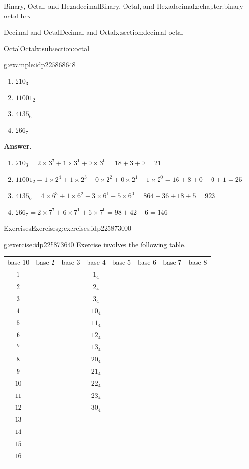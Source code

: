 \documentclass[twoside,10pt,]{book}
\newcommand{\blocktitlefont}{\relax}
\newcommand{\tabularfont}{\relax}
\numberwithin{equation}{section}
\newcommand{\hrulethin}  {\noalign{\hrule height 0.04em}}
\newcommand{\hrulemedium}{\noalign{\hrule height 0.07em}}
\newcommand{\hrulethick} {\noalign{\hrule height 0.11em}}
\begin{document}
\begin{chapterptx}{Binary, Octal, and Hexadecimal}{}{Binary, Octal, and Hexadecimal}{}{}{x:chapter:binary-octal-hex}
\begin{sectionptx}{Decimal and Octal}{}{Decimal and Octal}{}{}{x:section:decimal-octal}
\begin{subsectionptx}{Octal}{}{Octal}{}{}{x:subsection:octal}
\begin{example}{}{g:example:idp225868648}
\begin{enumerate}
\item{}\(\displaystyle 210_3\)%
\item{}\(\displaystyle 11001_2\)%
\item{}\(\displaystyle 4135_6\)%
\item{}\(\displaystyle 266_7\)%
\end{enumerate}
%
\par\smallskip%
\noindent\textbf{\blocktitlefont Answer}.\label{g:answer:idp225875176}{}\hypertarget{g:answer:idp225875176}{}\quad{}%
\begin{enumerate}
\item{}\(\displaystyle 210_3=2\times 3^2+1\times 3^1+0\times 3^0=18+3+0=21\)%
\item{}\(\displaystyle 11001_2=1\times 2^4+1\times 2^3+0\times 2^2+0\times 2^1+1\times 2^0=16+8+0+0+1=25\)%
\item{}\(\displaystyle 4135_6=4\times 6^3+1\times 6^2+3\times 6^1+5\times 6^0=864+36+18+5=923\)%
\item{}\(\displaystyle 266_7=2\times 7^2+6\times 7^1+6\times 7^0=98+42+6=146\)%
\end{enumerate}
%
\end{example}
\end{subsectionptx}
%
%
\typeout{************************************************}
\typeout{************************************************}
%
\begin{exercises-subsection}{Exercises}{}{Exercises}{}{}{g:exercises:idp225873000}
\begin{divisionexercise}{1}{}{}{g:exercise:idp225873640}%
Exercise involves the following table. \begin{center}%
{\tabularfont%
\begin{tabular}{cccccccc}\hrulethick
base 10&base 2&base 3&base 4&base 5&base 6&base 7&base 8\tabularnewline\hrulemedium
\(1\)&&&\(1_4\)&&&&\tabularnewline\hrulethin
\(2\)&&&\(2_4\)&&&&\tabularnewline\hrulethin
\(3\)&&&\(3_4\)&&&&\tabularnewline\hrulethin
\(4\)&&&\(10_4\)&&&&\tabularnewline\hrulethin
\(5\)&&&\(11_4\)&&&&\tabularnewline\hrulethin
\(6\)&&&\(12_4\)&&&&\tabularnewline\hrulethin
\(7\)&&&\(13_4\)&&&&\tabularnewline\hrulethin
\(8\)&&&\(20_4\)&&&&\tabularnewline\hrulethin
\(9\)&&&\(21_4\)&&&&\tabularnewline\hrulethin
\(10\)&&&\(22_4\)&&&&\tabularnewline\hrulethin
\(11\)&&&\(23_4\)&&&&\tabularnewline\hrulethin
\(12\)&&&\(30_4\)&&&&\tabularnewline\hrulethin
\(13\)&&&&&&&\tabularnewline\hrulethin
\(14\)&&&&&&&\tabularnewline\hrulethin
\(15\)&&&&&&&\tabularnewline\hrulethin
\(16\)&&&&&&&\tabularnewline\hrulethin

\end{tabular}}
\end{center}
\end{divisionexercise}
\end{exercises-subsection}
\end{sectionptx}
\end{chapterptx}
\end{document}
